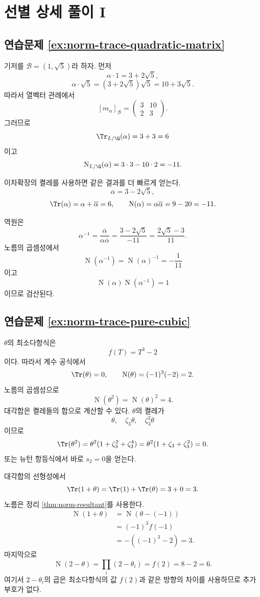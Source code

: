 \clearpage
\section{선별 상세 풀이 I}
\label{sec:norm-trace-solutions-a}

\subsection*{연습문제 \ref{ex:norm-trace-quadratic-matrix}}

\begin{solution}
기저를 $\mathcal B=(1,\sqrt5)$라 하자. 먼저
\[
  \alpha\cdot1=3+2\sqrt5,
\]
\[
  \alpha\cdot\sqrt5
  =(3+2\sqrt5)\sqrt5=10+3\sqrt5.
\]
따라서 열벡터 관례에서
\[
  [m_\alpha]_{\mathcal B}
  =\begin{pmatrix}
    3&10\\
    2&3
  \end{pmatrix}.
\]
그러므로
\[
  \Tr_{L/\Q}(\alpha)=3+3=6
\]
이고
\[
  \operatorname N_{L/\Q}(\alpha)
  =3\cdot3-10\cdot2=-11.
\]

이차확장의 켤레를 사용하면 같은 결과를 더 빠르게 얻는다.
\[
  \overline\alpha=3-2\sqrt5,
\]
\[
  \Tr(\alpha)=\alpha+\overline\alpha=6,
  \qquad
  \operatorname N(\alpha)=\alpha\overline\alpha=9-20=-11.
\]

역원은
\[
  \alpha^{-1}
  =\frac{\overline\alpha}{\alpha\overline\alpha}
  =\frac{3-2\sqrt5}{-11}
  =\frac{2\sqrt5-3}{11}.
\]
노름의 곱셈성에서
\[
  \operatorname N(\alpha^{-1})
  =\operatorname N(\alpha)^{-1}=-\frac1{11}
\]
이고
\[
  \operatorname N(\alpha)\operatorname N(\alpha^{-1})=1
\]
이므로 검산된다.
\end{solution}

\subsection*{연습문제 \ref{ex:norm-trace-pure-cubic}}

\begin{solution}
$\theta$의 최소다항식은
\[
  f(T)=T^3-2
\]
이다. 따라서 계수 공식에서
\[
  \Tr(\theta)=0,
  \qquad
  \operatorname N(\theta)=(-1)^3(-2)=2.
\]
노름의 곱셈성으로
\[
  \operatorname N(\theta^2)=\operatorname N(\theta)^2=4.
\]
대각합은 켤레들의 합으로 계산할 수 있다. $\theta$의 켤레가
\[
  \theta,\quad\zeta_3\theta,\quad\zeta_3^2\theta
\]
이므로
\[
  \Tr(\theta^2)
  =\theta^2(1+\zeta_3^2+\zeta_3^4)
  =\theta^2(1+\zeta_3+\zeta_3^2)=0.
\]
또는 뉴턴 항등식에서 바로 $s_2=0$을 얻는다.

대각합의 선형성에서
\[
  \Tr(1+\theta)=\Tr(1)+\Tr(\theta)=3+0=3.
\]
노름은 정리 \ref{thm:norm-resultant}를 사용한다.
\[
\begin{aligned}
  \operatorname N(1+\theta)
  &=\operatorname N(\theta-(-1))\\
  &=(-1)^3f(-1)\\
  &=-((-1)^3-2)=3.
\end{aligned}
\]
마지막으로
\[
  \operatorname N(2-\theta)
  =\prod_i(2-\theta_i)=f(2)=8-2=6.
\]
여기서 $2-\theta_i$의 곱은 최소다항식의 값 $f(2)$과 같은 방향의 차이를 사용하므로 추가 부호가 없다.
\end{solution}

